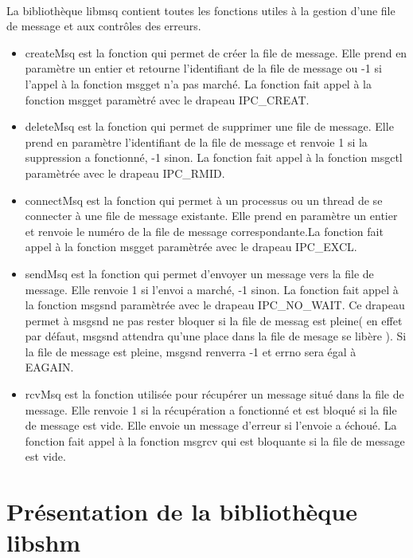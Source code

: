 \documentclass{report}
\begin{document}
		\paragraph{}
			La bibliothèque libmsq contient toutes les fonctions utiles à la gestion d'une file de message et aux contrôles des erreurs.
			\begin{itemize}
				\item createMsq est la fonction qui permet de créer la file de message. Elle prend en paramètre un entier et retourne l'identifiant de la file de message ou -1 si l'appel à la fonction msgget n'a pas marché. La fonction fait appel à la fonction msgget paramètré avec le drapeau IPC\_CREAT.
				\item deleteMsq est la fonction qui permet de supprimer une file de message. Elle prend en paramètre l'identifiant de la file de message et renvoie 1 si la suppression a fonctionné, -1 sinon. La fonction fait appel à la fonction msgctl paramètrée avec le drapeau IPC\_RMID.
				\item connectMsq est la fonction qui permet à un processus ou un thread de se connecter à une file de message existante. Elle prend en paramètre un entier et renvoie le numéro de la file de message correspondante.La fonction fait appel à la fonction msgget paramètrée avec le drapeau IPC\_EXCL.
				\item sendMsq est la fonction qui permet d'envoyer un message vers la file de message. Elle renvoie 1 si l'envoi a marché, -1 sinon. La fonction fait appel à la fonction msgsnd paramètrée avec le drapeau IPC\_NO\_WAIT. Ce drapeau permet à msgsnd ne pas rester bloquer si la file de messag est pleine( en effet par défaut, msgsnd attendra qu'une place dans la file de mesage se libère ). Si la file de message est pleine, msgsnd renverra -1 et errno sera égal à EAGAIN.
				\item rcvMsq est la fonction utilisée pour récupérer un message situé dans la file de message. Elle renvoie 1 si la récupération a fonctionné et est bloqué si la file de message est vide. Elle envoie un message d'erreur si l'envoie a échoué. La fonction fait appel à la fonction msgrcv qui est bloquante si la file de message est vide.
			\end{itemize}
	\section{Présentation de la bibliothèque libshm}
\end{document}
